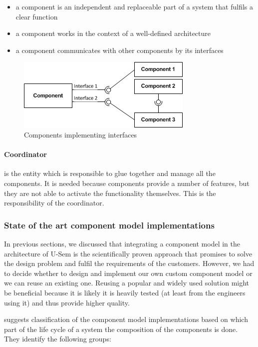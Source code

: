 \begin{itemize}
	\item a component is an independent and replaceable part of a system that fulfils a clear function
	\item a component works in the context of a well-defined architecture
	\item a component communicates with other components by its interfaces 
\end{itemize}

	\begin{figure}[h!]
  		\centering
  		\includegraphics[scale=0.75]{plug-in/component-services.png}
  		\caption{Components implementing interfaces }
  		\label{fig_comp}
	\end{figure}

\paragraph{Coordinator}
	is the entity which is responsible to glue together and manage all the components. It is needed because components provide a number of features, but they are not able to activate the functionality themselves. This is the responsibility of the coordinator.

\subsubsection{State of the art component model implementations}

In previous sections, we discussed that integrating a component model in the architecture of U-Sem is the scientifically proven approach that promises to solve the design problem and fulfil the requirements of the customers. However, we had to decide whether to design and implement our own custom component model or we can reuse an existing one. Reusing a popular and widely used solution might be beneficial because it is likely it is heavily tested (at least from the engineers using it) and thus provide higher quality. 

\cite{lau2007software} suggests classification of the component model implementations based on which part of the life cycle of a system the composition of the components is done. They identify the following groups:

